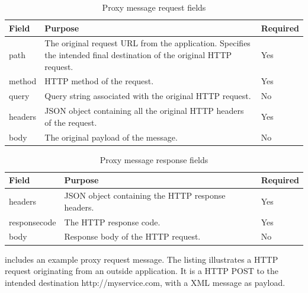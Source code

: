 \begin{table}[h]
\begin{tabularx}{\textwidth}{|l|X|l|}
\hline
\textbf{Field} & \textbf{Purpose}                                                                                                      & \textbf{Required} \\ \hline
path           & The original request URL from the application. Specifies the intended final destination of the original HTTP request. & Yes               \\ \hline
method         & HTTP method of the request.                                                                                           & Yes               \\ \hline
query          & Query string associated with the original HTTP request.                                                               & No                \\ \hline
headers        & JSON object containing all the original HTTP headers of the request.                                                   & Yes               \\ \hline
body           & The original payload of the message.                                                                                   & No                \\ \hline
\end{tabularx}
\caption{Proxy message request fields}
\label{table-proxy-request}
\end{table}

\begin{table}[h]
\begin{tabularx}{\textwidth}{|l|X|l|}
\hline
\textbf{Field} & \textbf{Purpose}   & \textbf{Required} \\ \hline
headers        & JSON object containing the HTTP response headers. & Yes  \\ \hline
responsecode   & The HTTP response code. & Yes \\ \hline
body           & Response body of the HTTP request. & No            \\ \hline
\end{tabularx}
\caption{Proxy message response fields}
\label{table-proxy-response}

\end{table}

 includes an example proxy request message. The
listing illustrates a HTTP request originating from an outside application. It
is a HTTP POST to the intended destination http://myservice.com, with a XML
message as payload.

